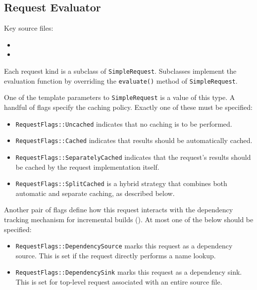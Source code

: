 \documentclass[../generics]{subfiles}
\begin{document}
\subsection*{Request Evaluator}
Key source files:
\begin{itemize}
\item {}
\item {}
\end{itemize}
Each request kind is a subclass of \texttt{SimpleRequest}. Subclasses implement the evaluation function by overriding the \texttt{evaluate()} method of \texttt{SimpleRequest}.

One of the template parameters to \texttt{SimpleRequest} is a value of this type. A handful of flags specify the caching policy. Exactly one of these must be specified:
\begin{itemize}
\item \texttt{RequestFlags::Uncached} indicates that no caching is to be performed.
\item \texttt{RequestFlags::Cached} indicates that results should be automatically cached.
\item \texttt{RequestFlags::SeparatelyCached} indicates that the request's results should be cached by the request implementation itself.
\item \texttt{RequestFlags::SplitCached} is a hybrid strategy that combines both automatic and separate caching, as described below.
\end{itemize}
Another pair of flags define how this request interacts with the dependency tracking mechanism for incremental builds (). At most one of the below should be specified:
\begin{itemize}
\item \texttt{RequestFlags::DependencySource} marks this request as a dependency source. This is set if the request directly performs a name lookup.
\item \texttt{RequestFlags::DependencySink} marks this request as a dependency sink. This is set for top-level request associated with an entire source file.
\end{itemize}
\end{document}
